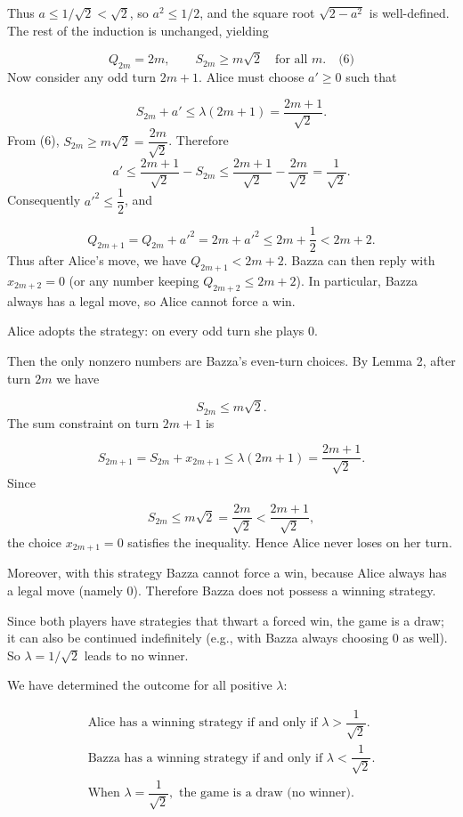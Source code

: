 Thus \(a \le 1/\sqrt{2} < \sqrt{2}\), so \(a^2 \le 1/2\), and the square root \(\sqrt{2 - a^2}\) is well-defined. The rest of the induction is unchanged, yielding\par
\[
Q_{2m}=2m, \qquad S_{2m} \ge m\sqrt{2} \quad\text{for all } m. \quad\text{(6)}
\]
Now consider any odd turn \(2m+1\). Alice must choose \(a' \ge 0\) such that\par
\[
S_{2m} + a' \le \lambda(2m+1) = \dfrac{2m+1}{\sqrt{2}}.
\]
From (6), \(S_{2m} \ge m\sqrt{2} = \dfrac{2m}{\sqrt{2}}\). Therefore
\[
a' \le \frac{2m+1}{\sqrt{2}} - S_{2m} \le \frac{2m+1}{\sqrt{2}} - \frac{2m}{\sqrt{2}} = \frac{1}{\sqrt{2}}.
\]
Consequently \(a'^2 \le \dfrac{1}{2}\), and\par
\[
Q_{2m+1} = Q_{2m} + a'^2 = 2m + a'^2 \le 2m + \frac{1}{2} < 2m+2.
\]
Thus after Alice's move, we have \(Q_{2m+1} < 2m+2\). Bazza can then reply with \(x_{2m+2}=0\) (or any number keeping \(Q_{2m+2} \le 2m+2\)). In particular, Bazza always has a legal move, so Alice cannot force a win.\par
{}
Alice adopts the strategy: on every odd turn she plays \(0\).\par
Then the only nonzero numbers are Bazza's even-turn choices. By Lemma 2, after turn \(2m\) we have\par
\[
S_{2m} \le m\sqrt{2}.
\]
The sum constraint on turn \(2m+1\) is\par
\[
S_{2m+1} = S_{2m} + x_{2m+1} \le \lambda(2m+1) = \dfrac{2m+1}{\sqrt{2}}.
\]
Since\par
\[
S_{2m} \le m\sqrt{2} = \dfrac{2m}{\sqrt{2}} < \dfrac{2m+1}{\sqrt{2}},
\]
the choice \(x_{2m+1}=0\) satisfies the inequality. Hence Alice never loses on her turn.\par
Moreover, with this strategy Bazza cannot force a win, because Alice always has a legal move (namely \(0\)). Therefore Bazza does not possess a winning strategy.\par
Since both players have strategies that thwart a forced win, the game is a draw; it can also be continued indefinitely (e.g., with Bazza always choosing \(0\) as well). So \(\lambda = 1/\sqrt{2}\) leads to no winner.\par
\smallskip
{}
We have determined the outcome for all positive \(\lambda\):\par
\[
\boxed{
\begin{array}{l}
\text{Alice has a winning strategy if and only if } \lambda > \dfrac{1}{\sqrt{2}}. \\[6pt]
\text{Bazza has a winning strategy if and only if } \lambda < \dfrac{1}{\sqrt{2}}. \\[6pt]
\text{When } \lambda = \dfrac{1}{\sqrt{2}}, \text{ the game is a draw (no winner).}
\end{array}
}
\]
\par

